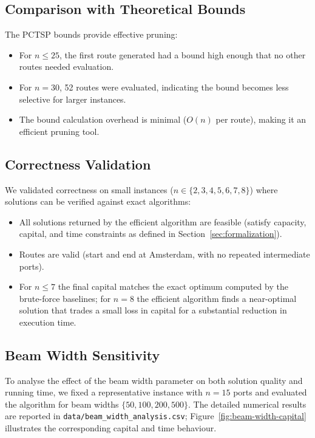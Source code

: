 \documentclass[12pt]{article}
\begin{document}
\subsection{Comparison with Theoretical Bounds}

The PCTSP bounds provide effective pruning:
\begin{itemize}
    \item For $n \leq 25$, the first route generated had a bound high enough that no other routes needed evaluation.
    \item For $n=30$, 52 routes were evaluated, indicating the bound becomes less selective for larger instances.
    \item The bound calculation overhead is minimal ($O(n)$ per route), making it an efficient pruning tool.
\end{itemize}

\subsection{Correctness Validation}

We validated correctness on small instances ($n \in \{2,3,4,5,6,7,8\}$) where solutions can be verified against exact algorithms:
\begin{itemize}
    \item All solutions returned by the efficient algorithm are feasible (satisfy capacity, capital, and time constraints as defined in Section~\ref{sec:formalization}).
    \item Routes are valid (start and end at Amsterdam, with no repeated intermediate ports).
    \item For $n \leq 7$ the final capital matches the exact optimum computed by the brute-force baselines; for $n = 8$ the efficient algorithm finds a near-optimal solution that trades a small loss in capital for a substantial reduction in execution time.
\end{itemize}

\subsection{Beam Width Sensitivity}

To analyse the effect of the beam width parameter on both solution quality and running time, we fixed a representative instance with $n=15$ ports and evaluated the algorithm for beam widths $\{50, 100, 200, 500\}$. The detailed numerical results are reported in \texttt{data/beam\_width\_analysis.csv}; Figure~\ref{fig:beam-width-capital} illustrates the corresponding capital and time behaviour.
\end{document}
